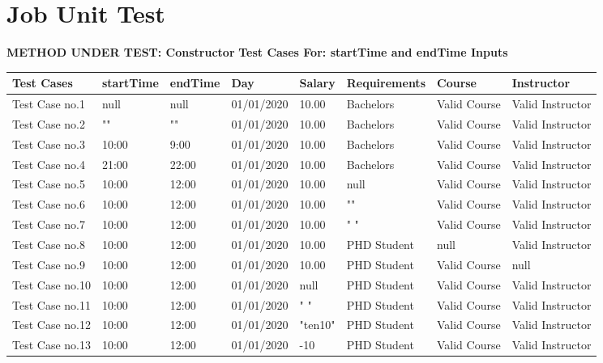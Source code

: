 \documentclass[12pt]{report}
\begin{document}
\section{Job Unit Test}
	\textbf{METHOD UNDER TEST: Constructor} \newline
	\textbf{Test Cases For: startTime and endTime Inputs}
	\begin{flushleft}
		\begin{tabular}{ | l | l | l | l | l | l | l | l | }
			\hline
			Test Cases & startTime & endTime & Day & Salary & Requirements & Course & Instructor \\ \hline
			Test Case no.1 & null & null & 01/01/2020 & 10.00 & Bachelors & Valid Course & Valid Instructor \\ \hline
			Test Case no.2 & "" & "" & 01/01/2020 & 10.00 & Bachelors & Valid Course & Valid Instructor \\ \hline
			Test Case no.3 & 10:00 & 9:00 & 01/01/2020 & 10.00 & Bachelors & Valid Course & Valid Instructor \\ \hline
			Test Case no.4 & 21:00 & 22:00 & 01/01/2020 & 10.00 & Bachelors & Valid Course & Valid Instructor \\ \hline
			Test Case no.5 & 10:00 & 12:00 & 01/01/2020 & 10.00 & null & Valid Course & Valid Instructor \\ \hline
			Test Case no.6 & 10:00 & 12:00 & 01/01/2020 & 10.00 & "" & Valid Course & Valid Instructor \\ \hline
			Test Case no.7 & 10:00 & 12:00 & 01/01/2020 & 10.00 & " " & Valid Course & Valid Instructor \\ \hline
			Test Case no.8 & 10:00 & 12:00 & 01/01/2020 & 10.00 & PHD Student & null & Valid Instructor \\ \hline
			Test Case no.9 & 10:00 & 12:00 & 01/01/2020 & 10.00 & PHD Student & Valid Course & null \\ \hline
			Test Case no.10 & 10:00 & 12:00 & 01/01/2020 & null & PHD Student & Valid Course & Valid Instructor \\ \hline
			Test Case no.11 & 10:00 & 12:00 & 01/01/2020 & " " & PHD Student & Valid Course & Valid Instructor \\ \hline
			Test Case no.12 & 10:00 & 12:00 & 01/01/2020 & "ten10" & PHD Student & Valid Course & Valid Instructor \\ \hline
			Test Case no.13 & 10:00 & 12:00 & 01/01/2020 & -10 & PHD Student & Valid Course & Valid Instructor \\ \hline
		\end{tabular}
	\end{flushleft}
	
\end{document}
